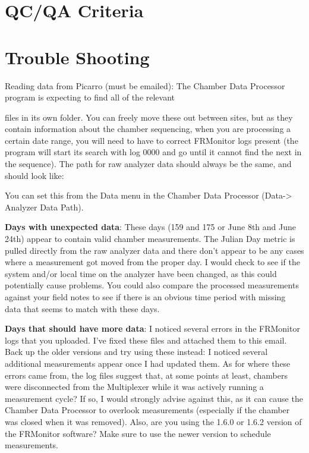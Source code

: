 \documentclass[12pt]{../SOP3}\usepackage[]{graphicx}\usepackage[]{color}
\begin{document}
\section{QC/QA Criteria}


\section{Trouble Shooting}
\NP Reading data from Picarro (must be emailed):
The Chamber Data Processor program is expecting to find all of the relevant 

files in its own folder. You can freely move these out between sites, but as they contain information about the chamber sequencing, when you are processing a certain date range, you will need to have to correct FRMonitor logs present (the program will start its search with log 0000 and go until it cannot find the next in the sequence). 
The path for raw analyzer data should always be the same, and should look like:  

You can set this from the Data menu in the Chamber Data Processor (Data-> Analyzer Data Path).

\NP \textbf{Days with unexpected data}:  
These days (159 and 175 or June 8th and June 24th) appear to contain valid chamber measurements. The Julian Day metric is pulled directly from the raw analyzer data and there don't appear to be any cases where a measurement got moved from the proper day. I would check to see if the system and/or local time on the analyzer have been changed, as this could potentially cause problems. You could also compare the processed measurements against your field notes to see if there is an obvious time period with missing data that seems to match with these days.

\NP \textbf{Days that should have more data}: 
I noticed several errors in the FRMonitor logs that you uploaded. I've fixed these files and attached them to this email. Back up the older versions and try using these instead: I noticed several additional measurements appear once I had updated them. As for where these errors came from, the log files suggest that, at some points at least, chambers were disconnected from the Multiplexer while it was actively running a measurement cycle? If so, I would strongly advise against this, as it can cause the Chamber Data Processor to overlook measurements (especially if the chamber was closed when it was removed). Also, are you using the 1.6.0 or 1.6.2 version of the FRMonitor software? Make sure to use the newer version to schedule measurements.
\end{document}
